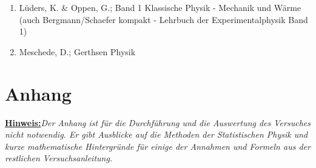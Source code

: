\documentclass[a4paper, 12pt]{scrartcl}
\begin{document}
\begin{enumerate}

  \item Lüders, K. \& Oppen, G.; Band 1 Klassische Physik - Mechanik und Wärme\\ (auch Bergmann/Schaefer kompakt - Lehrbuch der Experimentalphysik Band 1) \label{it:bergmann}

  \item Meschede, D.; Gerthsen Physik

\end{enumerate}
\newpage
\section*{Anhang}

\textbf{\underline{Hinweis:}}\textit{Der Anhang ist für die Durchführung und die Auswertung des Versuches nicht notwendig. Er gibt Ausblicke auf die Methoden der Statistischen Physik und kurze mathematische Hintergründe für einige der Annahmen und Formeln aus der restlichen Versuchsanleitung.}
\end{document}
